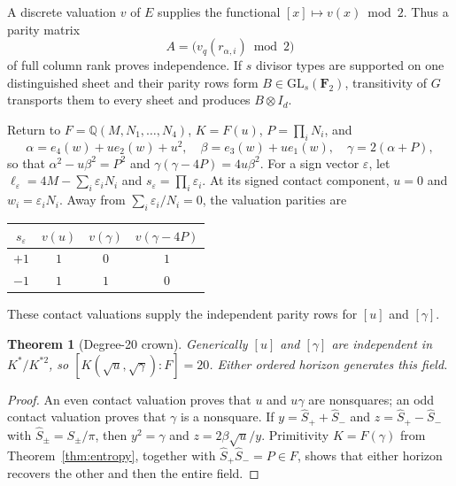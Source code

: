 \documentclass[11pt,a4paper]{article}
\newtheorem{theorem}{Theorem}[section]
\theoremstyle{definition}
\theoremstyle{remark}
\newcommand{\Q}{\mathbb{Q}}
\newcommand{\FF}{\mathbf{F}}
\begin{document}
A discrete valuation \(v\) of \(E\) supplies the functional
\([x]\mapsto v(x)\bmod2\). Thus a parity matrix
\begin{equation}
A=\bigl(v_q(r_{\alpha,i})\bmod2\bigr)
\label{eq:valuationmatrix}
\end{equation}
of full column rank proves independence. If \(s\) divisor types are supported on
one distinguished sheet and their parity rows form \(B\in\mathrm{GL}_s(\FF_2)\),
transitivity of \(G\) transports them to every sheet and produces
\(B\otimes I_d\).

Return to \(F=\Q(M,N_1,\ldots,N_4)\), \(K=F(u)\), \(P=\prod_iN_i\), and
\begin{equation}
\alpha=e_4(w)+ue_2(w)+u^2,
\quad
\beta=e_3(w)+ue_1(w),
\quad
\gamma=2(\alpha+P),
\label{eq:abg}
\end{equation}
so that \(\alpha^2-u\beta^2=P^2\) and \(\gamma(\gamma-4P)=4u\beta^2\). For a sign
vector \(\varepsilon\), let \(\ell_\varepsilon=4M-\sum_i\varepsilon_iN_i\) and
\(s_\varepsilon=\prod_i\varepsilon_i\). At its signed contact component, \(u=0\)
and \(w_i=\varepsilon_iN_i\). Away from \(\sum_i\varepsilon_i/N_i=0\), the
valuation parities are
\begin{center}
\begin{tabular}{@{}c@{\qquad}ccc@{}}
\toprule
\(s_\varepsilon\) & \(v(u)\) & \(v(\gamma)\) & \(v(\gamma-4P)\)\\
\midrule
\(+1\) & \(1\) & \(0\) & \(1\)\\
\(-1\) & \(1\) & \(1\) & \(0\)\\
\bottomrule
\end{tabular}
\end{center}
These contact valuations supply the independent parity rows for \([u]\) and
\([\gamma]\).

\begin{theorem}[Degree-20 crown]
\label{thm:crown20}
Generically \([u]\) and \([\gamma]\) are independent in \(K^*/K^{*2}\), so
\([K(\sqrt u,\sqrt\gamma):F]=20\). Either ordered horizon generates this field.
\end{theorem}

\begin{proof}
An even contact valuation proves that \(u\) and \(u\gamma\) are nonsquares; an
odd contact valuation proves that \(\gamma\) is a nonsquare. If
\(y=\widehat S_++\widehat S_-\) and \(z=\widehat S_+-\widehat S_-\) with
\(\widehat S_\pm=S_\pm/\pi\), then \(y^2=\gamma\) and
\(z=2\beta\sqrt u/y\). Primitivity \(K=F(\gamma)\) from Theorem~\ref{thm:entropy},
together with \(\widehat S_+\widehat S_-=P\in F\), shows that either horizon
recovers the other and then the entire field.
\end{proof}
\end{document}
